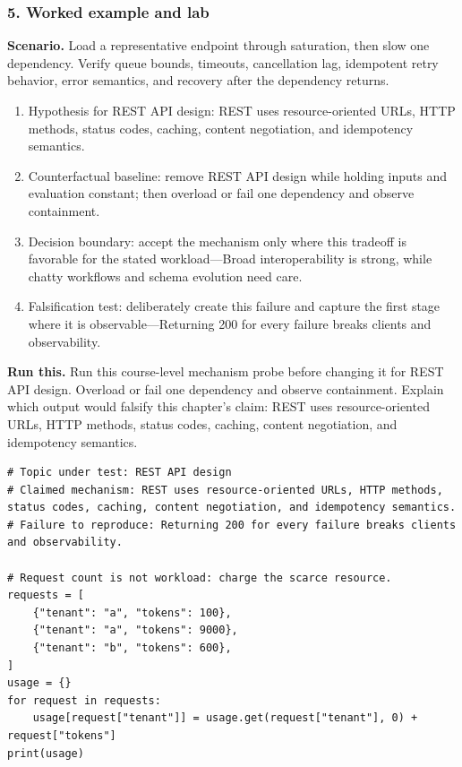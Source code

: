 \subsubsection*{5. Worked example and lab}
\textbf{Scenario.} Load a representative endpoint through saturation, then slow one dependency. Verify queue bounds, timeouts, cancellation lag, idempotent retry behavior, error semantics, and recovery after the dependency returns.
\begin{enumerate}
\item Hypothesis for REST API design: REST uses resource-oriented URLs, HTTP methods, status codes, caching, content negotiation, and idempotency semantics.
\item Counterfactual baseline: remove REST API design while holding inputs and evaluation constant; then overload or fail one dependency and observe containment.
\item Decision boundary: accept the mechanism only where this tradeoff is favorable for the stated workload—Broad interoperability is strong, while chatty workflows and schema evolution need care.
\item Falsification test: deliberately create this failure and capture the first stage where it is observable—Returning 200 for every failure breaks clients and observability.
\end{enumerate}
\textbf{Run this.} Run this course-level mechanism probe before changing it for REST API design. Overload or fail one dependency and observe containment. Explain which output would falsify this chapter's claim: REST uses resource-oriented URLs, HTTP methods, status codes, caching, content negotiation, and idempotency semantics.
\begin{Verbatim}[fontsize=\scriptsize]
# Topic under test: REST API design
# Claimed mechanism: REST uses resource-oriented URLs, HTTP methods, status codes, caching, content negotiation, and idempotency semantics.
# Failure to reproduce: Returning 200 for every failure breaks clients and observability.

# Request count is not workload: charge the scarce resource.
requests = [
    {"tenant": "a", "tokens": 100},
    {"tenant": "a", "tokens": 9000},
    {"tenant": "b", "tokens": 600},
]
usage = {}
for request in requests:
    usage[request["tenant"]] = usage.get(request["tenant"], 0) + request["tokens"]
print(usage)
\end{Verbatim}

